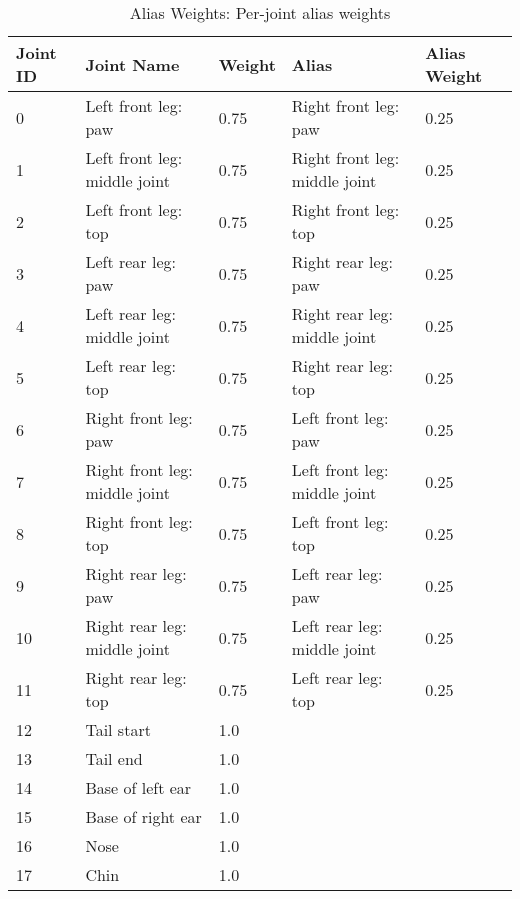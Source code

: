 \begin{table}[]
    \caption{Alias Weights: Per-joint alias weights}
    \begin{tabular}{@{}lllll@{}}
    \toprule
    Joint ID & Joint Name                    & Weight & Alias                         & Alias Weight \\ \midrule
    0        & Left front leg: paw           & 0.75   & Right front leg: paw          & 0.25         \\
    1        & Left front leg: middle joint  & 0.75   & Right front leg: middle joint & 0.25         \\
    2        & Left front leg: top           & 0.75   & Right front leg: top          & 0.25         \\
    3        & Left rear leg: paw            & 0.75   & Right rear leg: paw           & 0.25         \\
    4        & Left rear leg: middle joint   & 0.75   & Right rear leg: middle joint  & 0.25         \\
    5        & Left rear leg: top            & 0.75   & Right rear leg: top           & 0.25         \\
    6        & Right front leg: paw          & 0.75   & Left front leg: paw           & 0.25         \\
    7        & Right front leg: middle joint & 0.75   & Left front leg: middle joint  & 0.25         \\
    8        & Right front leg: top          & 0.75   & Left front leg: top           & 0.25         \\
    9        & Right rear leg: paw           & 0.75   & Left rear leg: paw            & 0.25         \\
    10       & Right rear leg: middle joint  & 0.75   & Left rear leg: middle joint   & 0.25         \\
    11       & Right rear leg: top           & 0.75   & Left rear leg: top            & 0.25         \\
    12       & Tail start                    & 1.0    &                               &              \\
    13       & Tail end                      & 1.0    &                               &              \\
    14       & Base of left ear              & 1.0    &                               &              \\
    15       & Base of right ear             & 1.0    &                               &              \\
    16       & Nose                          & 1.0    &                               &              \\
    17       & Chin                          & 1.0    &                               &             
    \end{tabular}
    \label{tab:alias-weights}
\end{table}